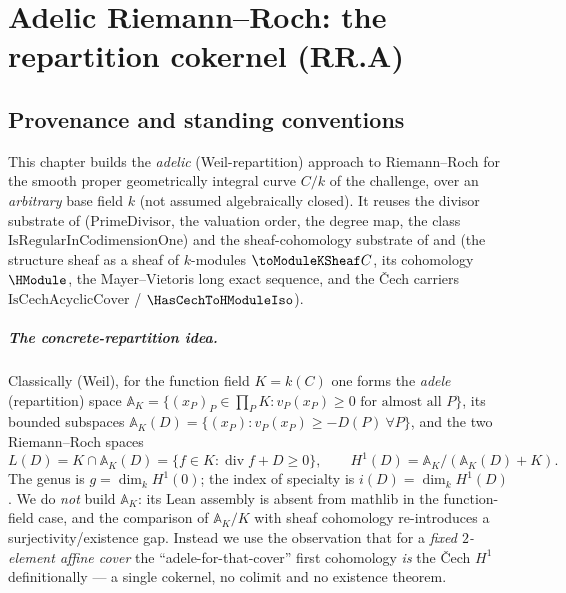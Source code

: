 \chapter{Adelic Riemann--Roch: the repartition cokernel (RR.A)}
\label{chap:RiemannRoch_Adelic}

\section{Provenance and standing conventions}
\label{sec:RiemannRoch_Adelic_intro}

This chapter builds the \emph{adelic} (Weil-repartition) approach to
Riemann--Roch for the smooth proper geometrically integral curve
\(C / k\) of the challenge, over an \emph{arbitrary} base field \(k\)
(not assumed algebraically closed). It reuses the divisor substrate of
 (\(\mathrm{PrimeDivisor}\), the
valuation \(\mathrm{order}\), the degree map, the class
\(\mathrm{IsRegularInCodimensionOne}\)) and the sheaf-cohomology
substrate of  and
 (the structure sheaf as a sheaf of \(k\)-modules
\(\toModuleKSheaf C\), its cohomology \(\HModule\), the Mayer--Vietoris
long exact sequence, and the Čech carriers
\(\mathrm{IsCechAcyclicCover}\) / \(\HasCechToHModuleIso\)).

\paragraph{The concrete-repartition idea.}
Classically (Weil), for the function field \(K = k(C)\) one forms the
\emph{adele} (repartition) space
\(\mathbb{A}_K = \{(x_P)_P \in \prod_P K : v_P(x_P) \ge 0 \text{ for
almost all } P\}\), its bounded subspaces
\(\mathbb{A}_K(D) = \{(x_P) : v_P(x_P) \ge -D(P)\ \forall P\}\), and the
two Riemann--Roch spaces
\[
  L(D) = K \cap \mathbb{A}_K(D)
        = \{ f \in K : \operatorname{div} f + D \ge 0\},
  \qquad
  H^1(D) = \mathbb{A}_K / (\mathbb{A}_K(D) + K).
\]
The genus is \(g = \dim_k H^1(0)\); the index of specialty is
\(i(D) = \dim_k H^1(D)\). We do \emph{not} build \(\mathbb{A}_K\): its
Lean assembly is absent from mathlib in the function-field case, and the
comparison of \(\mathbb{A}_K/K\) with sheaf cohomology re-introduces a
surjectivity/existence gap. Instead we use the observation that for a
\emph{fixed \(2\)-element affine cover} the ``adele-for-that-cover''
first cohomology \emph{is} the Čech \(H^1\) definitionally --- a single
cokernel, no colimit and no existence theorem.

